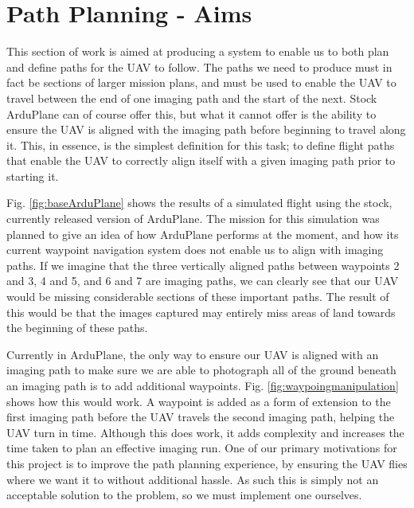 \section{Path Planning - Aims}
\label{task1:aims}

This section of work is aimed at producing a system to enable us to both plan and define paths for the UAV to follow. The paths we need to produce must in fact be sections of larger mission plans, and must be used to enable the UAV to travel between the end of one imaging path and the start of the next. Stock ArduPlane can of course offer this, but what it cannot offer is the ability to ensure the UAV is aligned with the imaging path before beginning to travel along it. This, in essence, is the simplest definition for this task; to define flight paths that enable the UAV to correctly align itself with a given imaging path prior to starting it.  

Fig. \ref{fig:baseArduPlane} shows the results of a simulated flight using the stock, currently released version of ArduPlane. The mission for this simulation was planned to give an idea of how ArduPlane performs at the moment, and how its current waypoint navigation system does not enable us to align with imaging paths. If we imagine that the three vertically aligned paths between waypoints 2 and 3, 4 and 5, and 6 and 7 are imaging paths, we can clearly see that our UAV would be missing considerable sections of these important paths. The result of this would be that the images captured may entirely miss areas of land towards the beginning of these paths. 

Currently in ArduPlane, the only way to ensure our UAV is aligned with an imaging path to make sure we are able to photograph all of the ground beneath an imaging path is to add additional waypoints. Fig. \ref{fig:waypoingmanipulation} shows how this would work. A waypoint is added as a form of extension to the first imaging path before the UAV travels the second imaging path, helping the UAV turn in time. Although this does work, it adds complexity and increases the time taken to plan an effective imaging run. One of our primary motivations for this project is to improve the path planning experience, by ensuring the UAV flies where we want it to without additional hassle. As such this is simply not an acceptable solution to the problem, so we must implement one ourselves.

